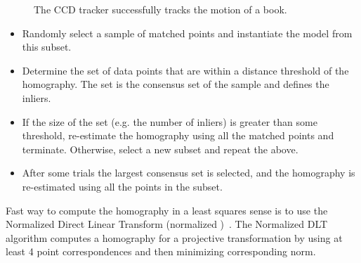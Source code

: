 \begin{figure}[htbp]
\begin{minipage}[t]{0.5\linewidth}
  \end{minipage} 
  \begin{minipage}[t]{0.5\linewidth} 
    \centering 
  \end{minipage} 
  \begin{minipage}[t]{0.5\linewidth} 
    \centering 
  \end{minipage} 
  \caption[The tracking result based on SIFT contour initialization]{The
    CCD tracker successfully tracks the motion of a book.
  }
  \label{fig:sifttracker}
\end{figure}

\begin{itemize}
\item  Randomly select a sample of matched points and instantiate the
  model from this subset.
\item Determine the set of data points that are within a distance
  threshold of the homography. The set is the consensus set of the sample
  and defines the inliers.
\item If the size of the set (e.g. the number of inliers) is greater
  than some threshold, re-estimate the homography using all the matched
  points and terminate. Otherwise, select a new subset and repeat the
  above.
\item After some trials the largest consensus set is selected, and the
  homography is re-estimated using all the points in the subset.
\end{itemize}
Fast way to compute the homography in a least squares sense is to use the Normalized
Direct Linear Transform (normalized
)~\cite{hartley2003multiple}. The Normalized DLT algorithm computes
a homography for a projective transformation by using at least 4 point
correspondences and then minimizing corresponding norm.

